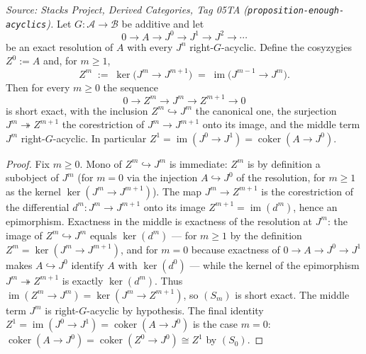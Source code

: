 \begin{lemma}
  \label{lem:cosyzygy_ses}
  \textit{Source: Stacks Project, Derived Categories, Tag 05TA
  (\texttt{proposition-enough-acyclics}).}
  Let \(G : \mathcal{A} \to \mathcal{B}\) be additive and let
  \[
    0 \longrightarrow A
      \longrightarrow J^0 \longrightarrow J^1 \longrightarrow J^2
      \longrightarrow \cdots
  \]
  be an exact resolution of \(A\) with every \(J^n\) right-\(G\)-acyclic. Define the
  cosyzygies \(Z^0 := A\) and, for \(m \geq 1\),
  \[
    Z^m \;:=\; \ker\bigl(J^m \to J^{m+1}\bigr)
      \;=\; \operatorname{im}\bigl(J^{m-1} \to J^m\bigr).
  \]
  Then for every \(m \geq 0\) the sequence
  \[
    0 \longrightarrow Z^m \longrightarrow J^m \longrightarrow Z^{m+1}
      \longrightarrow 0 \tag{$S_m$}
  \]
  is short exact, with the inclusion \(Z^m \hookrightarrow J^m\) the canonical one,
  the surjection \(J^m \twoheadrightarrow Z^{m+1}\) the corestriction of
  \(J^m \to J^{m+1}\) onto its image, and the middle term \(J^m\) right-\(G\)-acyclic.
  In particular \(Z^1 = \operatorname{im}(J^0 \to J^1) = \operatorname{coker}(A \to J^0)\).
\end{lemma}

\begin{proof}
  Fix \(m \geq 0\). Mono of \(Z^m \hookrightarrow J^m\) is immediate: \(Z^m\) is by
  definition a subobject of \(J^m\) (for \(m = 0\) via the injection \(A \hookrightarrow
  J^0\) of the resolution, for \(m \geq 1\) as the kernel \(\ker(J^m \to J^{m+1})\)).
  The map \(J^m \to Z^{m+1}\) is the corestriction of the differential
  \(d^m : J^m \to J^{m+1}\) onto its image \(Z^{m+1} = \operatorname{im}(d^m)\), hence
  an epimorphism. Exactness in the middle is exactness of the resolution at \(J^m\):
  the image of \(Z^m \hookrightarrow J^m\) equals \(\ker(d^m)\) --- for \(m \geq 1\)
  by the definition \(Z^m = \ker(J^m \to J^{m+1})\), and for \(m = 0\) because
  exactness of \(0 \to A \to J^0 \to J^1\) makes \(A \hookrightarrow J^0\) identify
  \(A\) with \(\ker(d^0)\) --- while the kernel of the epimorphism
  \(J^m \twoheadrightarrow Z^{m+1}\) is exactly \(\ker(d^m)\). Thus
  \(\operatorname{im}(Z^m \to J^m) = \ker(J^m \to Z^{m+1})\), so \((S_m)\) is short
  exact. The middle term \(J^m\) is right-\(G\)-acyclic by hypothesis. The final
  identity \(Z^1 = \operatorname{im}(J^0 \to J^1) = \operatorname{coker}(A \to J^0)\)
  is the case \(m = 0\): \(\operatorname{coker}(A \to J^0) = \operatorname{coker}(Z^0 \to J^0)
  \cong Z^1\) by \((S_0)\).
\end{proof}

